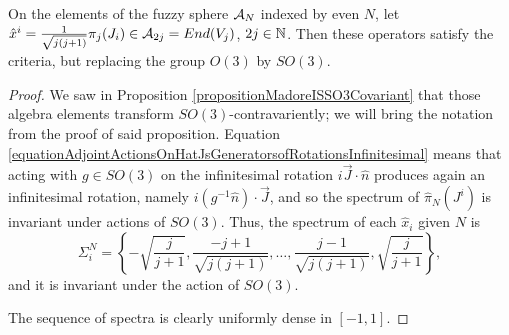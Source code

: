     
\begin{proposition}\label{propositionMadoreCoordinatesAreSO3ContravariantCovariant}
On the elements of the fuzzy sphere $\mathcal A_N$ indexed by even $N$, let $\hat x^i = \frac{1}{\sqrt{j(j+1)}}\pi_j(J_i) \in \mathcal A_{2j} = End(V_j)$, $2j \in \mathbb{N}$. Then these operators satisfy the criteria, but replacing the group $O(3)$ by $SO(3)$.
\end{proposition}
\begin{proof}
 We saw in Proposition \ref{propositionMadoreISSO3Covariant} that those algebra elements transform $SO(3)$-contravariently; we will bring the notation from the proof of said proposition. %
 Equation \eqref{equationAdjointActionsOnHatJsGeneratorsofRotationsInfinitesimal} means that acting with $g \in SO(3)$ on the infinitesimal rotation $i \vec J \cdot \hat n$ produces again an infinitesimal rotation, namely $i (g^{-1} \hat n)\cdot \vec J$, and so the spectrum of $\hat \pi_N(J^i)$ is invariant under actions of $SO(3)$. Thus, the spectrum of each $\hat x_i$ given $N$ is
 \begin{equation*}
     \Sigma^N_i = \left\{-\sqrt{\frac{j}{j+1}}, \frac{-j+1}{\sqrt{j(j+1)}}, \dots, \frac{j-1}{\sqrt{j(j+1)}},  \sqrt{\frac{j}{j+1}}\right\},
 \end{equation*} 
 and it is invariant under the action of $SO(3)$. 
 
 The sequence of spectra is clearly uniformly dense in $[-1, 1]$.
 
\end{proof}


